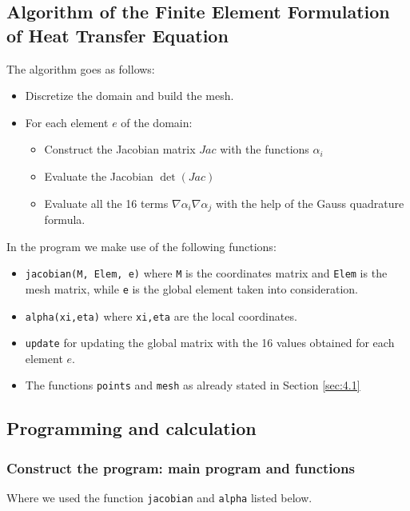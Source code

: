 \subsection{Algorithm of the Finite Element Formulation of Heat Transfer Equation}
The algorithm goes as follows:
\begin{itemize}
	\item Discretize the domain and build the mesh.
	\item For each element $ e $ of the domain:
	\begin{itemize}
		\item Construct the Jacobian matrix $ Jac $ with the functions $ \alpha_i $
		\item Evaluate the Jacobian $ \det(Jac) $
		\item Evaluate all the 16 terms $ \nabla\alpha_i\nabla\alpha_j $ with the help of the Gauss quadrature formula.
	\end{itemize}
\end{itemize}

In the program we make use of the following functions:
\begin{itemize}
	\item \texttt{jacobian(M, Elem, e)} where \texttt{M} is the coordinates matrix and \texttt{Elem} is the mesh matrix, while \texttt{e} is the global element taken into consideration.
	\item \texttt{alpha(xi,eta)} where \texttt{xi,eta} are the local coordinates.
	\item \texttt{update} for updating the global matrix with the 16 values obtained for each element $ e $. 
	\item The functions \texttt{points} and \texttt{mesh} as already stated in Section \ref{sec:4.1} 
\end{itemize}



\subsection{Programming and calculation}
\subsubsection{Construct the program: main program and functions}


Where we used the function \texttt{jacobian} and \texttt{alpha} listed below.

